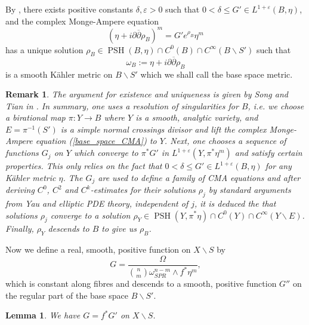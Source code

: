 \documentclass[12pt]{article}
\newtheorem{lemma}[theorem]{Lemma}
\newtheorem{remark}[theorem]{Remark}
\numberwithin{equation}{section}
\renewcommand{\d}{\partial}
\newcommand{\dbar}{\overline{\partial}}
\newcommand{\e}{\varepsilon}
\DeclareMathOperator{\PSH}{PSH}
\begin{document}
\noindent By \cite[Prop. 3.2, Thm. 3.2]{ST12}, there exists positive constants $\delta, \varepsilon > 0$ such that $0 < \delta \leq G' \in L^{1+\e}(B, \eta)$, and the complex Monge-Ampere equation
\begin{equation}\label{base_space_CMA}
    \left(\eta + i\d\dbar \rho_B\right)^m = G' e^{\rho_B} \eta^m
\end{equation}
has a unique solution $\rho_B \in \PSH(B,\eta) \cap C^0(B) \cap C^{\infty}(B\backslash S')$ such that
\begin{equation*}
    \omega_B := \eta + i\d\dbar \rho_B
\end{equation*}
is a smooth K\"ahler metric on $B \backslash S'$ which we shall call the base space metric.

\begin{remark}\label{base_space_CMA_remark}
The argument for existence and uniqueness is given by Song and Tian in \cite[Thm. 3.2]{ST12}. In summary, one uses a resolution of singularities for $B$, i.e. we choose a birational map $\pi: Y \to B$ where $Y$ is a smooth, analytic variety, and $E = \pi^{-1}(S')$ is a simple normal crossings divisor and lift the complex Monge-Ampere equation (\ref{base_space_CMA}) to $Y$. Next, one chooses a sequence of functions $G_j$ on $Y$ which converge to $\pi^*G'$ in $L^{1+\e}(Y,\pi^*\eta^m)$ and satisfy certain properties. This only relies on the fact that $0 < \delta \leq G' \in L^{1+\e}(B,\eta)$ for any K\"ahler metric $\eta$. The $G_j$ are used to define a family of CMA equations and after deriving $C^0$, $C^2$ and $C^k$-estimates for their solutions $\rho_j$ by standard arguments from Yau and elliptic PDE theory, independent of $j$, it is deduced the that solutions $\rho_j$ converge to a solution $\rho_Y \in \PSH(Y,\pi^*\eta) \cap C^0(Y) \cap C^{\infty}(Y\backslash E)$. Finally, $\rho_Y$ descends to $B$ to give us $\rho_B$.
\end{remark}

\noindent Now we define a real, smooth, positive function on $X\backslash S$ by
\begin{equation*}
    G = \frac{\Omega}{{n\choose m}\omega_{SPR}^{n-m} \wedge f^*\eta^m},
\end{equation*}
which is constant along fibres and descends to a smooth, positive function $G''$ on the regular part of the base space $B\backslash S'$.

\begin{lemma}\label{pullback_G'_is_G}
We have $G = f^*G'$ on $X\backslash S$.
\end{lemma}
\end{document}
